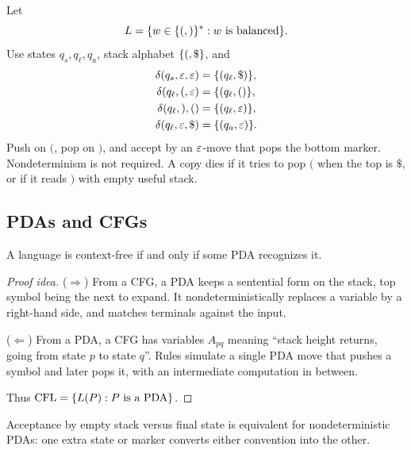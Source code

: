 \begin{example}
Let
\[
  L=\{w\in\{(,)\}^*:w\text{ is balanced}\}.
\]
Use states $q_s,q_\ell,q_a$, stack alphabet $\{(,\mathdollar\}$, and
\[
\begin{aligned}
  \delta(q_s,\varepsilon,\varepsilon)
    &=\{(q_\ell,\mathdollar)\},\\
  \delta(q_\ell,(,\varepsilon)
    &=\{(q_\ell,( )\},\\
  \delta(q_\ell,),()
    &=\{(q_\ell,\varepsilon)\},\\
  \delta(q_\ell,\varepsilon,\mathdollar)
    &=\{(q_a,\varepsilon)\}.
\end{aligned}
\]
Push on $($, pop on $)$, and accept by an $\varepsilon$-move that pops the bottom
marker. Nondeterminism is not required. A copy dies if it tries to pop $($
when the top is $\mathdollar$, or if it reads $)$ with empty useful stack.
\end{example}

\subsection{PDAs and CFGs}
\begin{theorem}
A language is context-free if and only if some PDA recognizes it.
\end{theorem}

\begin{proof}[Proof idea]
($\Rightarrow$) From a CFG, a PDA keeps a sentential form on the stack, top
symbol being the next to expand. It nondeterministically replaces a variable
by a right-hand side, and matches terminals against the input.

($\Leftarrow$) From a PDA, a CFG has variables $A_{pq}$ meaning ``stack height
returns, going from state $p$ to state $q$''. Rules simulate a single PDA
move that pushes a symbol and later pops it, with an intermediate computation
in between.

Thus $\mathrm{CFL}=\{L(P):P\text{ is a PDA}\}$.
\end{proof}

Acceptance by empty stack versus final state is equivalent for nondeterministic
PDAs: one extra state or marker converts either convention into the other.
